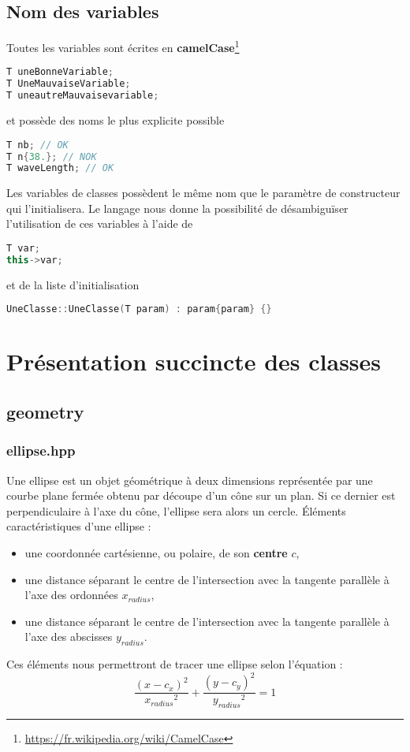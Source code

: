 \documentclass[a4paper,11pt]{report}
\begin{document}
\section{Nom des variables}
Toutes les variables sont écrites en
\textbf{camelCase}\footnote{\url{https://fr.wikipedia.org/wiki/CamelCase}}
\begin{lstlisting}[frame=single,language=C++]
T uneBonneVariable;
T UneMauvaiseVariable;
T uneautreMauvaisevariable;
\end{lstlisting}
et possède des noms le plus explicite possible
\begin{lstlisting}[frame=single,language=C++]
T nb; // OK
T n{38.}; // NOK
T waveLength; // OK
\end{lstlisting}
Les variables de classes possèdent le même nom que le paramètre de constructeur
qui l'initialisera. Le langage nous donne la possibilité de désambiguïser
l'utilisation de ces variables à l'aide de 
\begin{lstlisting}[frame=single,language=C++]
T var;
this->var;
\end{lstlisting}
et de la liste d'initialisation
\begin{lstlisting}[frame=single,language=C++]
UneClasse::UneClasse(T param) : param{param} {}
\end{lstlisting}
\chapter[Les classes]{Présentation succincte des classes}
\section[Les objets géométriques]{geometry}

\subsection[Ellipse]{ellipse.hpp}
\begin{center}
\end{center}
Une ellipse est un objet géométrique à deux dimensions représentée par
une courbe plane fermée obtenu par découpe d'un cône sur un plan. Si ce dernier
est perpendiculaire à l'axe du cône, l'ellipse sera alors un cercle.
Éléments caractéristiques d'une ellipse :
\begin{itemize}
	\item une coordonnée cartésienne, ou polaire, de son \textbf{centre} $c$,
	\item une distance séparant le centre de l'intersection avec la tangente
		parallèle à l'axe des ordonnées $x_{radius}$,
	\item une distance séparant le centre de l'intersection avec la tangente
		parallèle à l'axe des abscisses $y_{radius}$.
\end{itemize}
Ces éléments nous permettront de tracer une ellipse selon l'équation :
$$\frac{(x - c_x)^2}{{x_{radius}}^2} + \frac{(y - c_y)^2}{{y_{radius}}^2} = 1$$
\end{document}
